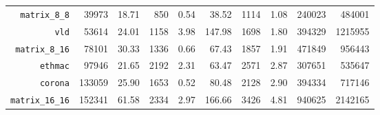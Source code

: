 {\begin{tabular}{|r|r|r|r|r|r|r|r|r|r|}
   \texttt{matrix\_8\_8}         &   39973 &   18.71 &   850 &    0.54 &   38.52 &  1114 &    1.08 & 240023 & 484001 \\
   \texttt{vld}                  &   53614 &   24.01 &  1158 &    3.98 &  147.98 &  1698 &    1.80 & 394329 & 1215955 \\
   \texttt{matrix\_8\_16}        &   78101 &   30.33 &  1336 &    0.66 &   67.43 &  1857 &    1.91 & 471849 & 956443 \\
   \texttt{ethmac}               &   97946 &   21.65 &  2192 &    2.31 &   63.47 &  2571 &    2.87 & 307651 & 535647 \\
   \texttt{corona}               &  133059 &   25.90 &  1653 &    0.52 &   80.48 &  2128 &    2.90 & 394334 & 717146 \\
   \texttt{matrix\_16\_16}       &  152341 &   61.58 &  2334 &    2.97 &  166.66 &  3426 &    4.81 & 940625 & 2142165 \\
   \hline
 \end{tabular}
 }
